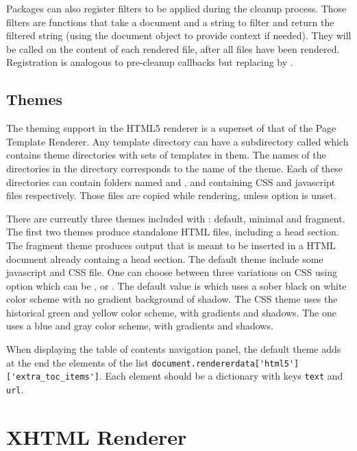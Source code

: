 Packages can also register filters to be applied during the cleanup
process. Those filters are functions that take a document and a string
to filter and return the filtered string (using the document object to
provide context if needed). They will be called on the content of each
rendered file, after all files have been rendered.  Registration is
analogous to pre-cleanup callbacks but replacing
 by .

\subsection{Themes}

The theming support in the HTML5 renderer is a superset of that of the
Page Template Renderer. Any template directory can have a subdirectory called
 which contains theme directories with sets of templates
in them.  The names of the directories in the  directory
corresponds to the name of the theme. Each of these directories can contain
folders named  and , and containing CSS and javascript files
respectively. Those files are copied while rendering, unless
option  is unset.

There are currently three themes included with \plasTeX: default, minimal and
fragment. The first two themes produce standalone HTML files, including a head
section. The fragment theme produces output that is meant to be inserted in a
HTML document already containg a head section. The default theme include some
javascript and CSS file. One can choose between three variations on CSS using
option  which can be ,  or
. The default value is  which uses a sober black on
white color scheme with no gradient background of shadow. The 
CSS theme uses the historical \plasTeX{} green and yellow color scheme, with
gradients and shadows. The  one uses a blue and gray color scheme,
with gradients and shadows.

When displaying the table of contents navigation panel, the default theme adds
at the end the elements of the list
\verb+document.rendererdata['html5']['extra_toc_items']+.
Each element should be a dictionary with keys \verb+text+ and \verb+url+.

\section{XHTML Renderer}

